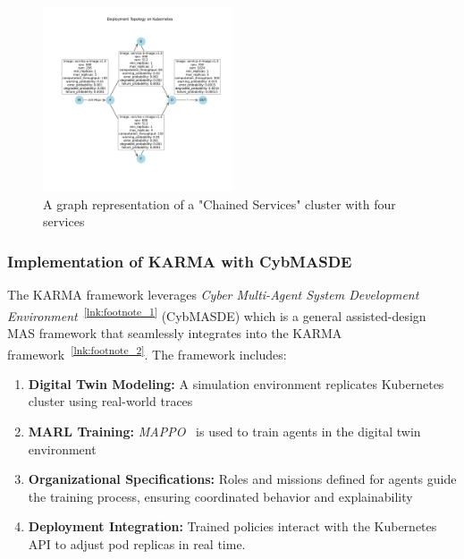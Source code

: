 \begin{figure}[h!]
    \centering
    \hspace{-0.4cm}
    \includegraphics[trim=1.8cm 3.3cm 1.25cm 3.5cm, clip, width=0.5\textwidth]{figures/k8s_cluster_graph.pdf}
    \caption{A graph representation of a "Chained Services" cluster with four services}
    \label{fig:chained_services_graph}
\end{figure}

\subsubsection{Implementation of KARMA with CybMASDE}



The KARMA framework leverages \textit{Cyber Multi-Agent System Development Environment}~\textsuperscript{\autoref{lnk:footnote_1}} (CybMASDE) which is a general assisted-design MAS framework that seamlessly integrates into the KARMA framework~\textsuperscript{\autoref{lnk:footnote_2}}.
The framework includes:
\begin{enumerate}[label=\textbf{\arabic*)}, itemjoin={;\quad }]
    \item \textbf{Digital Twin Modeling:} A simulation environment replicates Kubernetes cluster using real-world traces
    \item \textbf{MARL Training:} \textit{MAPPO}~\cite{Yu2022} is used to train agents in the digital twin environment
    \item \textbf{Organizational Specifications:} Roles and missions defined for agents guide the training process, ensuring coordinated behavior and explainability
    \item \textbf{Deployment Integration:} Trained policies interact with the Kubernetes API to adjust pod replicas in real time.
\end{enumerate}

